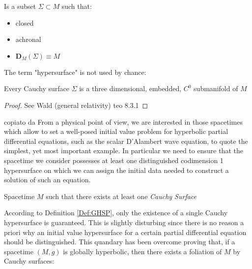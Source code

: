 \documentclass[a4paper,12pt]{scrartcl}    %
\begin{document}
	\begin{definition}
		Is a subset $\Sigma \subset M$ such that:
		\begin{itemize}
			\item closed
			\item achronal
			\item $\mathbf{D}_M(\Sigma) \equiv M$
		\end{itemize}
	\end{definition}

	The term "hypersurface" is not used by chance:	
	\begin{proposition}
		Every Cauchy surface $\Sigma$ is a three dimensional, embedded, $C^0$ submanifold of $M$
	\end{proposition}
	\begin{proof}
		See Wald (general relativity) teo 8.3.1
	\end{proof}
	

		\begin{Warning}
		\danger copiato da \cite{primer}
		From a physical point of view, we are interested in those spacetimes which allow to set a well-posed
initial value problem for hyperbolic partial differential equations, such as the scalar D’Alambert wave equation, to quote the simplest, yet most important example. In particular we need to ensure that the spacetime we consider possesses at least one distinguished codimension 1 hypersurface on which we can assign the initial data needed to construct a solution of such an equation.	
		\end{Warning}	
		
		\begin{definition}\label{Def:GHSP}
			 Spacetime $M$ such that there exists at least one \emph{Cauchy Surface}
		\end{definition}
		
		According to Definition \ref{Def:GHSP}, only the existence of a single Cauchy hypersurface is guaranteed. 
		This is slightly disturbing since there is no reason a priori why an initial value hypersurface for a certain partial differential equation should be distinguished. 
		This quandary has been overcome proving that, if a spacetime $(M,g)$ is globally hyperbolic, then there exists a foliation of $M$ by Cauchy surfaces:
		
\end{document}

